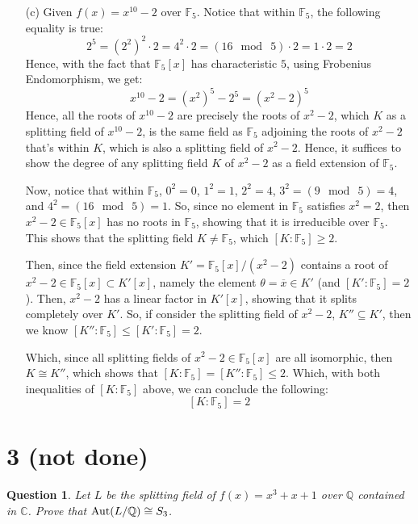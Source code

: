 \documentclass{article}
\newtheorem{question}{Question}
\begin{document}
\begin{itemize}
    \hfil

    \item[(c)] Given $f(x)=x^{10}-2$ over $\mathbb{F}_5$. Notice that within $\mathbb{F}_5$, the following equality is true:
    $$2^5 = (2^2)^2\cdot 2=4^2\cdot 2 = (16\mod\ 5)\cdot 2 = 1\cdot 2 =  2$$
    Hence, with the fact that $\mathbb{F}_5[x]$ has characteristic $5$, using Frobenius Endomorphism, we get:
    $$x^{10}-2 = (x^2)^5 - 2^5 = (x^2-2)^5$$
    Hence, all the roots of $x^{10}-2$ are precisely the roots of $x^2-2$, which $K$ as a splitting field of $x^{10}-2$, is the same field as $\mathbb{F}_5$ adjoining the roots of $x^2-2$ that's within $K$, which is also a splitting field of $x^2-2$. Hence, it suffices to show the degree of any splitting field $K$ of $x^2-2$ as a field extension of $\mathbb{F}_5$.

    Now, notice that within $\mathbb{F}_5$, $0^2=0$, $1^2=1$, $2^2=4$, $3^2=(9\mod\ 5) = 4$, and $4^2 = (16\mod\ 5) = 1$. So, since no element in $\mathbb{F}_5$ satisfies $x^2 = 2$, then $x^2-2\in\mathbb{F}_5[x]$ has no roots in $\mathbb{F}_5$, showing that it is irreducible over $\mathbb{F}_5$. This shows that the splitting field $K\neq \mathbb{F}_5$, which $[K:\mathbb{F}_5]\geq 2$.

    Then, since the field extension $K' = \mathbb{F}_5[x]/(x^2-2)$ contains a root of $x^2-2\in\mathbb{F}_5[x]\subset K'[x]$, namely the element $\theta=\overline{x}\in K'$ (and  $[K':\mathbb{F}_5]=2$). Then, $x^2-2$ has a linear factor in $K'[x]$, showing that it splits completely over $K'$. So, if consider the splitting field of $x^2-2$, $K''\subseteq K'$, then we know $[K'':\mathbb{F}_5]\leq [K':\mathbb{F}_5] = 2$.

    Which, since all splitting fields of $x^2-2\in\mathbb{F}_5[x]$ are all isomorphic, then $K\cong K''$, which shows that $[K:\mathbb{F}_5] = [K'':\mathbb{F}_5]\leq 2$. Which, with both inequalities of $[K:\mathbb{F}_5]$ above, we can conclude the following:
    $$[K:\mathbb{F}_5] = 2$$
\end{itemize}

\break

\section*{3 (not done)}
\begin{myBox}[]{}
    \begin{question}
        Let $L$ be the splitting field of $f(x)=x^3+x+1$ over $\mathbb{Q}$ contained in $\mathbb{C}$. Prove that $\textmd{Aut}(L/\mathbb{Q})\cong S_3$.
    \end{question}
\end{myBox}
\end{document}
